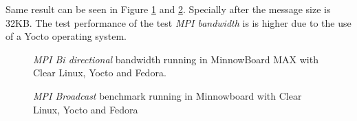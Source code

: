Same result can be seen in Figure \ref{mpi_bibw_yocto} and
\ref{mpi_broadcast_yocto}. Specially after the
message size is 32KB. The test performance of the test \textit{MPI bandwidth}
is is higher due to the use of a Yocto operating system. 

\begin{figure}[H]
\begin{center}
\end{center}
\caption{\textit{MPI Bi directional} bandwidth running in MinnowBoard MAX with Clear Linux,
Yocto and Fedora.}
\label{mpi_bibw_yocto}
\end{figure}

\begin{figure}[H]
\begin{center}
\end{center}
\caption{\textit{MPI Broadcast} benchmark running in Minnowboard with Clear Linux, Yocto and Fedora }
\label{mpi_broadcast_yocto}
\end{figure}

